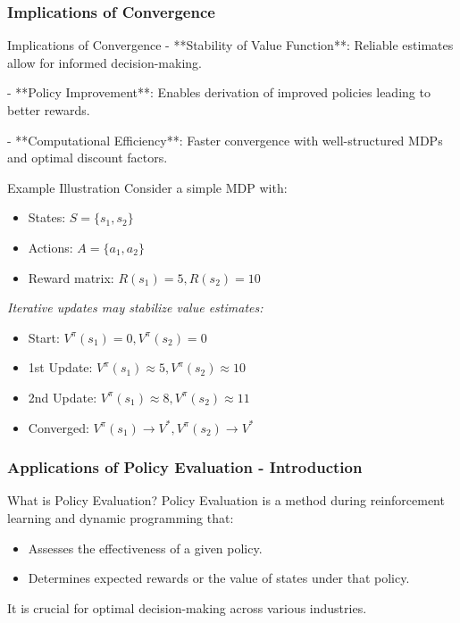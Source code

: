 \documentclass[aspectratio=169]{beamer}
\begin{document}
\begin{frame}[fragile]
    \frametitle{Implications of Convergence}
    \begin{block}{Implications of Convergence}
        - **Stability of Value Function**: Reliable estimates allow for informed decision-making.
        
        - **Policy Improvement**: Enables derivation of improved policies leading to better rewards.
        
        - **Computational Efficiency**: Faster convergence with well-structured MDPs and optimal discount factors.
    \end{block}

    \begin{block}{Example Illustration}
        Consider a simple MDP with:
        \begin{itemize}
            \item States: \( S = \{s_1, s_2\} \)
            \item Actions: \( A = \{a_1, a_2\} \)
            \item Reward matrix: \( R(s_1) = 5, R(s_2) = 10 \)
        \end{itemize}
        \textit{Iterative updates may stabilize value estimates:}
        \begin{itemize}
            \item Start: \( V^\pi(s_1) = 0, V^\pi(s_2) = 0 \)
            \item 1st Update: \( V^\pi(s_1) \approx 5, V^\pi(s_2) \approx 10 \)
            \item 2nd Update: \( V^\pi(s_1) \approx 8, V^\pi(s_2) \approx 11 \)
            \item Converged: \( V^\pi(s_1) \rightarrow V^*, V^\pi(s_2) \rightarrow V^* \)
        \end{itemize}
    \end{block}
\end{frame}

\begin{frame}[fragile]
    \frametitle{Applications of Policy Evaluation - Introduction}
    \begin{block}{What is Policy Evaluation?}
        Policy Evaluation is a method during reinforcement learning and dynamic programming that:
        \begin{itemize}
            \item Assesses the effectiveness of a given policy.
            \item Determines expected rewards or the value of states under that policy.
        \end{itemize}
        It is crucial for optimal decision-making across various industries.
    \end{block}
\end{frame}
\end{document}
